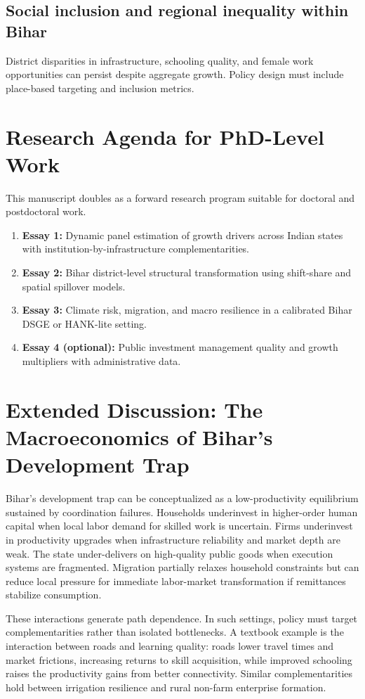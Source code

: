 \documentclass[preprint,12pt]{elsarticle}
\begin{document}
\subsection{Social inclusion and regional inequality within Bihar}
District disparities in infrastructure, schooling quality, and female work opportunities can persist despite aggregate growth. Policy design must include place-based targeting and inclusion metrics.

\section{Research Agenda for PhD-Level Work}
This manuscript doubles as a forward research program suitable for doctoral and postdoctoral work.

\begin{enumerate}[leftmargin=1.2cm]
\item \textbf{Essay 1:} Dynamic panel estimation of growth drivers across Indian states with institution-by-infrastructure complementarities.
\item \textbf{Essay 2:} Bihar district-level structural transformation using shift-share and spatial spillover models.
\item \textbf{Essay 3:} Climate risk, migration, and macro resilience in a calibrated Bihar DSGE or HANK-lite setting.
\item \textbf{Essay 4 (optional):} Public investment management quality and growth multipliers with administrative data.
\end{enumerate}

\section{Extended Discussion: The Macroeconomics of Bihar's Development Trap}
Bihar's development trap can be conceptualized as a low-productivity equilibrium sustained by coordination failures. Households underinvest in higher-order human capital when local labor demand for skilled work is uncertain. Firms underinvest in productivity upgrades when infrastructure reliability and market depth are weak. The state under-delivers on high-quality public goods when execution systems are fragmented. Migration partially relaxes household constraints but can reduce local pressure for immediate labor-market transformation if remittances stabilize consumption.

These interactions generate path dependence. In such settings, policy must target complementarities rather than isolated bottlenecks. A textbook example is the interaction between roads and learning quality: roads lower travel times and market frictions, increasing returns to skill acquisition, while improved schooling raises the productivity gains from better connectivity. Similar complementarities hold between irrigation resilience and rural non-farm enterprise formation.
\end{document}

